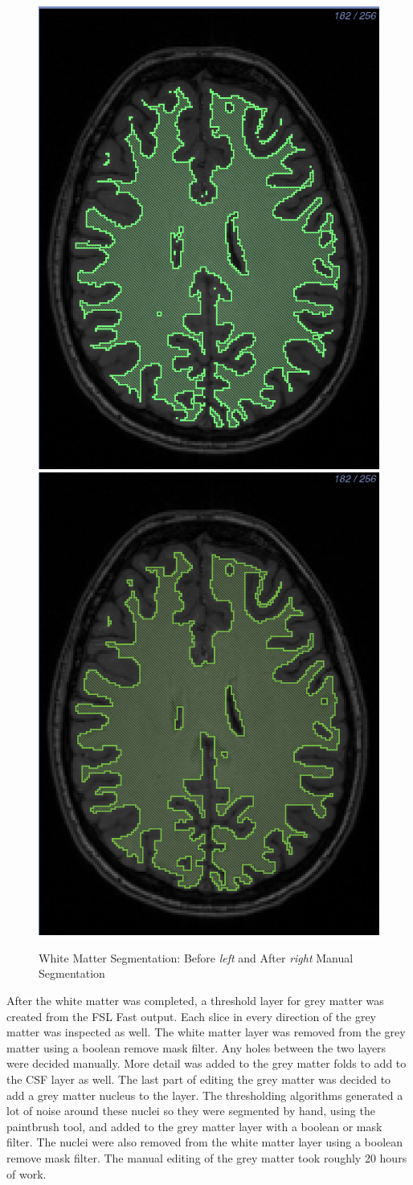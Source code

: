 \begin{figure}[H]
\begin{center}
\includegraphics[width=.49\textwidth]{Figures/whitematter_before}
\includegraphics[width=.49\textwidth]{Figures/whitematter_after}
\caption{White Matter Segmentation: Before \textit{left} and After \textit{right} Manual Segmentation}
\label{fig:wm}
\end{center}
\end{figure}

After the white matter was completed, a threshold layer for grey matter was created from the FSL Fast output. Each slice in every direction of the grey matter was inspected as well. The white matter layer was removed from the grey matter using a boolean remove mask filter. Any holes between the two layers were decided manually. More detail was added to the grey matter folds to add to the CSF layer as well. The last part of editing the grey matter was decided to add a grey matter nucleus to the layer. The thresholding algorithms generated a lot of noise around these nuclei so they were segmented by hand, using the paintbrush tool, and added to the grey matter layer with a boolean or mask filter. The nuclei were also removed from the white matter layer using a boolean remove mask filter. The manual editing of the grey matter took roughly 20 hours of work.

